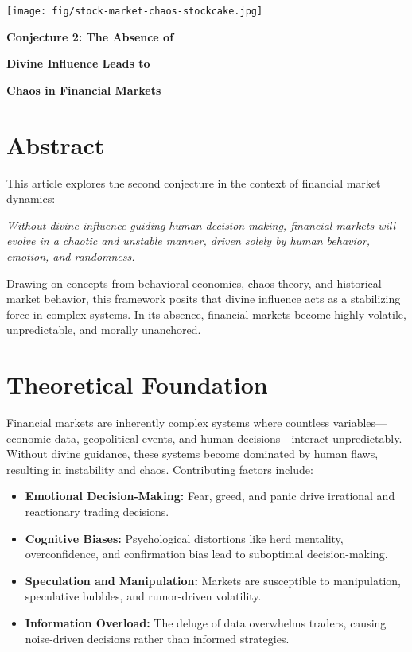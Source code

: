 \documentclass[a4]{article}
\newcommand{\bn}{\bigskip\noindent}
\newcommand{\mn}{\medskip\noindent}
\begin{document}
\begin{center}
\texttt{[image: fig/stock-market-chaos-stockcake.jpg]}
\end{center}

\mn
{\huge\bf Conjecture 2: The Absence of }

\bn
{\huge\bf  Divine Influence Leads to }

\bn
{\huge\bf   Chaos in Financial Markets}

\bn
\section*{Abstract}


This article explores the second conjecture in the context of financial market dynamics: 

\bn
\emph{Without divine influence guiding human decision-making, financial markets will evolve in a chaotic and unstable manner, driven solely by human behavior, emotion, and randomness.}

\bn
Drawing on concepts from behavioral economics, chaos theory, and historical market behavior, this framework posits that divine influence acts as a stabilizing force in complex systems. In its absence, financial markets become highly volatile, unpredictable, and morally unanchored.


\bn
\section{Theoretical Foundation}

Financial markets are inherently complex systems where countless variables---economic data, geopolitical events, and human decisions---interact unpredictably. Without divine guidance, these systems become dominated by human flaws, resulting in instability and chaos. Contributing factors include:

\begin{itemize}
\item   {\bf Emotional Decision-Making:}  Fear, greed, and panic drive irrational and reactionary trading decisions.
\item  {\bf Cognitive Biases:}  Psychological distortions like herd mentality, overconfidence, and confirmation bias lead to suboptimal decision-making.
\item {\bf Speculation and Manipulation:}  Markets are susceptible to manipulation, speculative bubbles, and rumor-driven volatility.
\item {\bf Information Overload:}  The deluge of data overwhelms traders, causing noise-driven decisions rather than informed strategies.
\end{itemize}
\end{document}
